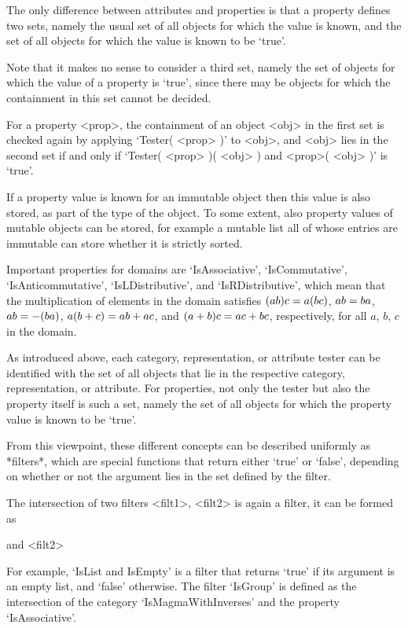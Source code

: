 The only difference between attributes and properties is that a property
defines two sets,
namely the usual set of all objects for which the value is known,
and the set of all objects for which the value is known to be `true'.

Note that it makes no sense to consider a third set, namely the set of
objects for which the value of a property is `true', since there may be
objects for which the containment in this set cannot be decided.

For a property <prop>, the containment of an object <obj> in the first
set is checked again by applying `Tester( <prop> )' to <obj>,
and <obj> lies in the second set if and only if
`Tester( <prop> )( <obj> ) and <prop>( <obj> )' is `true'.

If a property value is known for an immutable object then this value is
also stored, as part of the type of the object.
To some extent, also property values of mutable objects can be stored,
for example a mutable list all of whose entries are immutable can store
whether it is strictly sorted.

Important properties for domains are `IsAssociative', `IsCommutative',
`IsAnticommutative', `IsLDistributive', and `IsRDistributive',
which mean that the multiplication of elements in the domain satisfies
$(a \* b ) \* c = a \* ( b \* c )$, $a \* b = b \* a$,
$a \* b = - ( b \* a )$, $a \* ( b + c ) = a \* b + a \* c$,
and $( a + b ) \* c = a \* c + b \* c$, respectively,
for all $a$, $b$, $c$ in the domain.


As introduced above, each category, representation, or attribute tester
can be identified with the set of all objects that lie in the respective
category, representation, or attribute.
For properties, not only the tester but also the property itself is such
a set,
namely the set of all objects for which the property value is known to be
`true'.

{}From this viewpoint, these different concepts can be described
uniformly as *filters*,
which are special {\GAP} functions that return either `true' or `false',
depending on whether or not the argument lies in the set defined by the
filter.

The intersection of two filters <filt1>, <filt2> is again a filter,
it can be formed as

 and <filt2>

For example, `IsList and IsEmpty' is a filter that returns `true'
if its argument is an empty list, and `false' otherwise.
The filter `IsGroup' is defined as the intersection of the category
`IsMagmaWithInverses' and the property `IsAssociative'.

